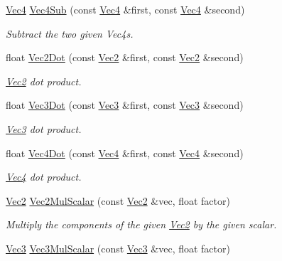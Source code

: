 \begin{DoxyCompactItemize}
\hyperlink{classgfxmath_1_1_vec4}{Vec4} \hyperlink{group___s_i_s_d_vec_math_ga01968b83532d01613a8f89659d4a52dc}{Vec4\+Sub} (const \hyperlink{classgfxmath_1_1_vec4}{Vec4} \&first, const \hyperlink{classgfxmath_1_1_vec4}{Vec4} \&second)
\begin{DoxyCompactList}\small\item\em Subtract the two given Vec4s. \end{DoxyCompactList}\item 
float \hyperlink{group___s_i_s_d_vec_math_gaf722c71a1e9ef7bf97d9489b1cf561e0}{Vec2\+Dot} (const \hyperlink{classgfxmath_1_1_vec2}{Vec2} \&first, const \hyperlink{classgfxmath_1_1_vec2}{Vec2} \&second)
\begin{DoxyCompactList}\small\item\em \hyperlink{classgfxmath_1_1_vec2}{Vec2} dot product. \end{DoxyCompactList}\item 
float \hyperlink{group___s_i_s_d_vec_math_ga02eb26d5238095f747d35890a597e489}{Vec3\+Dot} (const \hyperlink{classgfxmath_1_1_vec3}{Vec3} \&first, const \hyperlink{classgfxmath_1_1_vec3}{Vec3} \&second)
\begin{DoxyCompactList}\small\item\em \hyperlink{classgfxmath_1_1_vec3}{Vec3} dot product. \end{DoxyCompactList}\item 
float \hyperlink{group___s_i_s_d_vec_math_ga2deb01c8dd6f1a06c0a0cfc2e96e9c1e}{Vec4\+Dot} (const \hyperlink{classgfxmath_1_1_vec4}{Vec4} \&first, const \hyperlink{classgfxmath_1_1_vec4}{Vec4} \&second)
\begin{DoxyCompactList}\small\item\em \hyperlink{classgfxmath_1_1_vec4}{Vec4} dot product. \end{DoxyCompactList}\item 
\hyperlink{classgfxmath_1_1_vec2}{Vec2} \hyperlink{group___s_i_s_d_vec_math_ga8e4fd4586284706a28625b0fca6c85e7}{Vec2\+Mul\+Scalar} (const \hyperlink{classgfxmath_1_1_vec2}{Vec2} \&vec, float factor)
\begin{DoxyCompactList}\small\item\em Multiply the components of the given \hyperlink{classgfxmath_1_1_vec2}{Vec2} by the given scalar. \end{DoxyCompactList}\item 
\hyperlink{classgfxmath_1_1_vec3}{Vec3} \hyperlink{group___s_i_s_d_vec_math_ga79475199c50b1ee42edc6aa8b5c5795f}{Vec3\+Mul\+Scalar} (const \hyperlink{classgfxmath_1_1_vec3}{Vec3} \&vec, float factor)

\end{DoxyCompactItemize}
